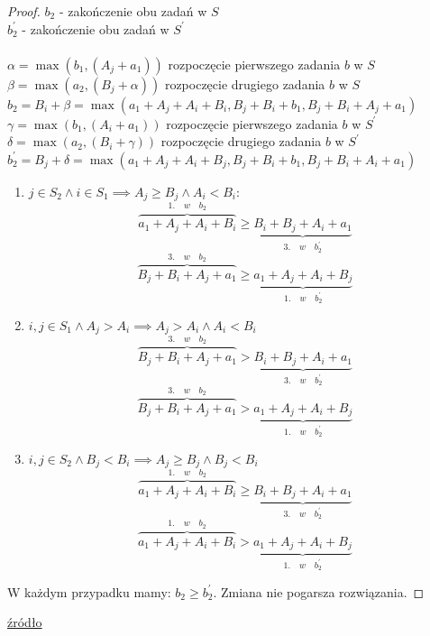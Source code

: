 \documentclass{article}
\begin{document}
\begin{proof}
$b_{2}$ - zakończenie obu zadań w $S$\\
$b_{2}^\prime$ - zakończenie obu zadań w $S^\prime$\\\\
$\alpha = \max(b_1, (A_j + a_1))$ rozpoczęcie pierwszego zadania $b$ w $S$\\
$\beta = \max(a_2, (B_j + \alpha))$ rozpoczęcie drugiego zadania $b$ w $S$\\
$b_2 = B_i + \beta = \max(a_1+A_j+A_i+B_i, B_j + B_i +b_1, B_j+B_i +A_j+a_1)$\\
$\gamma = \max(b_1,(A_i+a_1))$ rozpoczęcie pierwszego zadania $b$ w $S^\prime$\\
$\delta = \max(a_2,(B_i+\gamma))$ rozpoczęcie drugiego zadania $b$ w $S^\prime$\\
$b_2^\prime = B_j + \delta = \max(a_1+A_j+A_i+B_j, B_j + B_i +b_1, B_j+B_i +A_i+a_1)$\\
\begin{enumerate}
    \item $j \in S_2 \land i \in S_1 \implies A_j \geq B_j \land A_i < B_i$:
    $$
    \overbrace{a_1 + A_j + A_i + B_i}^{1. \quad w \quad b_2} \geq \underbrace{B_i + B_j + A_i + a_1}_{3. \quad w \quad b_2^\prime}
    $$
    $$
    \overbrace{B_j + B_i + A_j + a_1}^{3. \quad w \quad b_2} \geq \underbrace{a_1 + A_j + A_i + B_j}_{1. \quad w \quad b_2^\prime}
    $$
    \item $i,j \in S_1 \land A_j > A_i \implies A_j > A_i \land A_i < B_i$
    $$
    \overbrace{B_j + B_i + A_j + a_1}^{3. \quad w \quad b_2} > \underbrace{B_i + B_j + A_i + a_1}_{3. \quad w \quad b_2^\prime}
    $$
    $$
    \overbrace{B_j + B_i + A_j + a_1}^{3. \quad w \quad b_2} > \underbrace{a_1 + A_j + A_i + B_j}_{1. \quad w \quad b_2^\prime}
    $$
    \item $i,j \in S_2 \land B_j < B_i \implies A_j \geq B_j \land B_j < B_i$
    $$
    \overbrace{a_1 + A_j + A_i + B_i}^{1. \quad w \quad b_2} \geq \underbrace{B_i + B_j + A_i + a_1}_{3. \quad w \quad b_2^\prime}
    $$
    $$
    \overbrace{a_1 + A_j + A_i + B_i}^{1. \quad w \quad b_2} > \underbrace{a_1 + A_j + A_i + B_j}_{1. \quad w \quad b_2^\prime}
    $$
\end{enumerate}
W każdym przypadku mamy: $b_2 \geq b_2^\prime$. Zmiana nie pogarsza rozwiązania.
\end{proof}
\href{https://personal.utdallas.edu/~chandra/documents/6363/lec7.pdf}{źródło}
\clearpage
\end{document}
